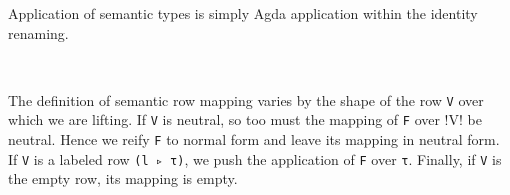 \documentclass[authoryear, acmsmall, screen, review, nonacm]{acmart}
\begin{document}
\Ni Application of semantic types is simply Agda application within the identity renaming.

\begin{code}%
\>[0]\AgdaSpace{}%
\AgdaSymbol{:}\AgdaSpace{}%
\AgdaSpace{}%
\AgdaSpace{}%
\AgdaSymbol{(}\AgdaSpace{}%
\AgdaSpace{}%
\AgdaSymbol{)}\AgdaSpace{}%
\AgdaSpace{}%
\AgdaSpace{}%
\AgdaSpace{}%
\AgdaSpace{}%
\AgdaSpace{}%
\AgdaSpace{}%
\AgdaSpace{}%
\<%
\\
\>[0]\AgdaSpace{}%
\AgdaSpace{}%
\AgdaSpace{}%
\AgdaSymbol{=}\AgdaSpace{}%
\AgdaSpace{}%
\AgdaSpace{}%
\<%
\end{code}

\Ni The definition of semantic row mapping varies by the shape of the row \verb!V! over which we are lifting. If \verb!V! is neutral, so too must the mapping of \verb!F! over !V! be neutral. Hence we reify \verb!F! to normal form and leave its mapping in neutral form. If \verb!V! is a labeled row \verb!(l ▹ τ)!, we push the application of \verb!F! over \verb!τ!. Finally, if \verb!V! is the empty row, its mapping is empty.
\end{document}
